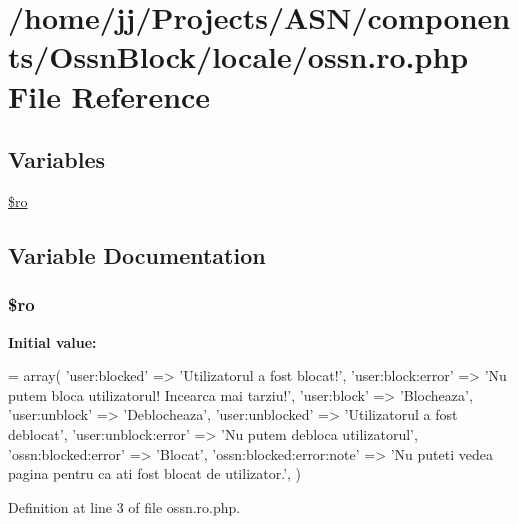 \hypertarget{components_2_ossn_block_2locale_2ossn_8ro_8php}{}\section{/home/jj/\+Projects/\+A\+S\+N/components/\+Ossn\+Block/locale/ossn.ro.\+php File Reference}
\label{components_2_ossn_block_2locale_2ossn_8ro_8php}
\subsection*{Variables}
\begin{DoxyCompactItemize}
\item 
\hyperlink{components_2_ossn_block_2locale_2ossn_8ro_8php_ad432e1965f7fa8ce0807b244734e70f8}{\$ro}
\end{DoxyCompactItemize}


\subsection{Variable Documentation}
\subsubsection[{\texorpdfstring{\$ro}{$ro}}]{\setlength{\rightskip}{0pt plus 5cm}\$ro}\hypertarget{components_2_ossn_block_2locale_2ossn_8ro_8php_ad432e1965f7fa8ce0807b244734e70f8}{}\label{components_2_ossn_block_2locale_2ossn_8ro_8php_ad432e1965f7fa8ce0807b244734e70f8}
{\bfseries Initial value\+:}
\begin{DoxyCode}
= array(
    \textcolor{stringliteral}{'user:blocked'} => \textcolor{stringliteral}{'Utilizatorul a fost blocat!'},
    \textcolor{stringliteral}{'user:block:error'} => \textcolor{stringliteral}{'Nu putem bloca utilizatorul! Incearca mai tarziu!'},
    \textcolor{stringliteral}{'user:block'} => \textcolor{stringliteral}{'Blocheaza'},
    \textcolor{stringliteral}{'user:unblock'} => \textcolor{stringliteral}{'Deblocheaza'},
    \textcolor{stringliteral}{'user:unblocked'} => \textcolor{stringliteral}{'Utilizatorul a fost deblocat'},
    \textcolor{stringliteral}{'user:unblock:error'} => \textcolor{stringliteral}{'Nu putem debloca utilizatorul'},
    \textcolor{stringliteral}{'ossn:blocked:error'} => \textcolor{stringliteral}{'Blocat'},
    \textcolor{stringliteral}{'ossn:blocked:error:note'} => \textcolor{stringliteral}{'Nu puteti vedea pagina pentru ca ati fost blocat de utilizator.'},
)
\end{DoxyCode}


Definition at line 3 of file ossn.\+ro.\+php.

